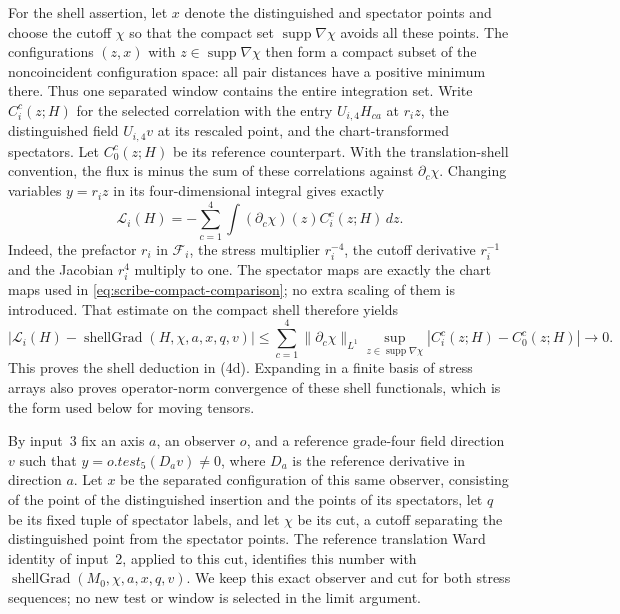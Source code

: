 For the shell assertion, let $x$ denote the distinguished and spectator
points and choose the cutoff $\chi$ so that the compact set
$\operatorname{supp}\nabla\chi$ avoids all these points. The
configurations $(z,x)$ with $z\in\operatorname{supp}\nabla\chi$ then
form a compact subset of the noncoincident configuration space: all
pair distances have a positive minimum there. Thus one separated
window contains the entire integration set. Write $C_i^c(z;H)$ for
the selected correlation with the entry $U_{i,4}H_{ca}$ at $r_i z$,
the distinguished field $U_{i,4}v$ at its rescaled point, and the
chart-transformed spectators. Let $C_0^c(z;H)$ be its reference
counterpart. With the translation-shell convention, the flux is minus
the sum of these correlations against $\partial_c\chi$.
Changing variables $y=r_i z$
in its four-dimensional integral gives exactly
\begin{equation}\label{eq:scribe-shell-change}
 \mathcal L_i(H)
   =-\sum_{c=1}^4\int (\partial_c\chi)(z)C_i^c(z;H)\,dz.
\end{equation}
Indeed, the prefactor $r_i$ in $\mathscr F_i$, the stress multiplier
$r_i^{-4}$, the cutoff derivative $r_i^{-1}$ and the Jacobian $r_i^4$
multiply to one. The spectator maps are exactly the chart maps used
in \eqref{eq:scribe-compact-comparison}; no extra scaling of them is
introduced. That estimate on the compact shell therefore yields
\[
 |\mathcal L_i(H)-\operatorname{shellGrad}(H,\chi,a,x,q,v)|
 \le\sum_{c=1}^4\|\partial_c\chi\|_{L^1}
       \sup_{z\in\operatorname{supp}\nabla\chi}
          |C_i^c(z;H)-C_0^c(z;H)|\longrightarrow0.
\]
This proves the shell deduction in (4d). Expanding in a finite basis
of stress arrays also proves operator-norm convergence of these shell
functionals, which is the form used below for moving tensors.

By input~3 fix an axis $a$, an
observer $o$, and a reference grade-four field direction $v$ such that
$y=o.test_5(D_a v)\ne0$, where $D_a$ is the reference derivative in direction
$a$. Let $x$ be the separated configuration of this same observer,
consisting of the point of the distinguished insertion and the points of
its spectators, let $q$ be its fixed tuple of spectator labels, and let
$\chi$ be its cut, a cutoff separating the distinguished point from the
spectator points. The reference translation Ward identity of input~2, applied to
this cut, identifies this number with
$\operatorname{shellGrad}(M_0,\chi,a,x,q,v)$. We keep this exact observer and
cut for both stress sequences; no new test or window is selected in the
limit argument.

